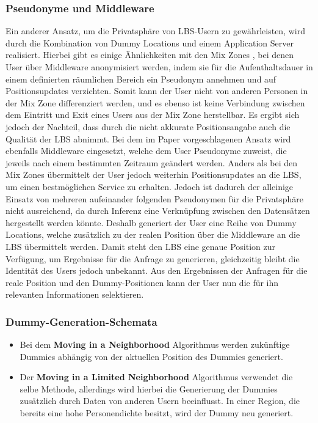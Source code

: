 \subsubsection{Pseudonyme und Middleware \cite{Sahu2012}} \label{subsubsection:pseudomiddle}
Ein anderer Ansatz, um die Privatsphäre von LBS-Usern zu gewährleisten, wird durch die Kombination von Dummy Locations und einem Application Server realisiert. Hierbei gibt es einige Ähnlichkeiten mit den Mix Zones \cite{Beresford2003}, bei denen User über Middleware anonymisiert werden, indem sie für die Aufenthaltsdauer in einem definierten räumlichen Bereich ein Pseudonym annehmen und auf Positionsupdates verzichten. Somit kann der User nicht von anderen Personen in der Mix Zone differenziert werden, und es ebenso ist keine Verbindung zwischen dem Eintritt und Exit eines Users aus der Mix Zone herstellbar. Es ergibt sich jedoch der Nachteil, dass durch die nicht akkurate Positionsangabe auch die Qualität der LBS abnimmt. 
Bei dem im Paper vorgeschlagenen Ansatz wird ebenfalls Middleware eingesetzt, welche dem User Pseudonyme zuweist, die jeweils nach einem bestimmten Zeitraum geändert werden. Anders als bei den Mix Zones übermittelt der User jedoch weiterhin Positionsupdates an die LBS, um einen bestmöglichen Service zu erhalten. Jedoch ist dadurch der alleinige Einsatz von mehreren aufeinander folgenden Pseudonymen für die Privatsphäre nicht ausreichend, da durch Inferenz eine Verknüpfung zwischen den Datensätzen hergestellt werden könnte. Deshalb generiert der User eine Reihe von Dummy Locations, welche zusätzlich zu der realen Position über die Middleware an die LBS übermittelt werden. Damit steht den LBS eine genaue Position zur Verfügung, um Ergebnisse für die Anfrage zu generieren, gleichzeitig bleibt die Identität des Users jedoch unbekannt. Aus den Ergebnissen der Anfragen für die reale Position und den Dummy-Positionen kann der User nun die für ihn relevanten Informationen selektieren.

\subsubsection{Dummy-Generation-Schemata \cite{Kido2005, You2007}} \label{subsubsection:dgschema}
\begin{itemize}
	\item Bei dem \textbf{Moving in a Neighborhood} Algorithmus werden zukünftige Dummies abhängig von der aktuellen Position des Dummies generiert.
	\item Der \textbf{Moving in a Limited Neighborhood} Algorithmus verwendet die selbe Methode, allerdings wird hierbei die Generierung der Dummies zusätzlich durch Daten von anderen Usern beeinflusst. In einer Region, die bereits eine hohe Personendichte besitzt, wird der Dummy neu generiert.
\end{itemize}

